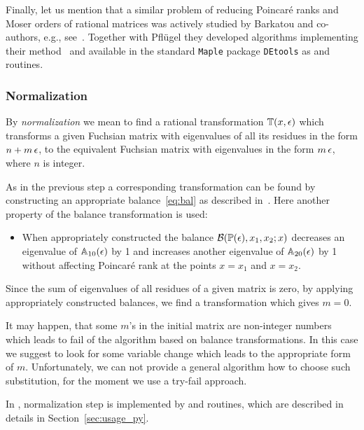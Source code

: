 \documentclass[12pt,a4paper]{article}
\begin{document}
Finally, let us mention that a similar problem of reducing Poincar\'e ranks and Moser orders of rational matrices was actively studied by Barkatou and co-authors, e.g., see~\cite{BP99}.
Together with Pfl\"ugel they developed algorithms implementing their method~\cite{BP99} and available in the standard \texttt{Maple} package \texttt{DEtools} as  and  routines.



\subsubsection{Normalization}
\label{sec:norm}

By {\em normalization} we mean to find a rational transformation $\mathbb{T}(x,\epsilon)$ which transforms a given Fuchsian matrix with eigenvalues of all its residues in the form $n + m \, \epsilon$, to the equivalent Fuchsian matrix with eigenvalues in the form $m \, \epsilon$, where $n$ is integer.

As in the previous step a corresponding transformation can be found by constructing an appropriate balance~\eqref{eq:bal} as described in~\cite[p.~11]{Lee15}.
Here another property of the balance transformation is used:
\begin{itemize}
    \item When appropriately constructed the balance $\mathcal{B}(\mathbb{P}(\epsilon), x_1, x_2; x)$ decreases an eigenvalue of $\mathbb{A}_{10}(\epsilon)$ by 1 and increases another eigenvalue of $\mathbb{A}_{20}(\epsilon)$ by 1 without affecting Poincar\'e rank at the points $x=x_1$ and $x=x_2$.
\end{itemize}
Since the sum of eigenvalues of all residues of a given matrix is zero, by applying appropriately constructed balances, we find a transformation which gives $m = 0$.

It may happen, that some $m$'s in the initial matrix are non-integer numbers which leads to fail of the algorithm based on balance transformations.
In this case we suggest to look for some variable change which leads to the appropriate form of $m$.
Unfortunately, we can not provide a general algorithm how to choose such substitution, for the moment we use a try-fail approach.

In \fuchsia, normalization step is implemented by  and  routines, which are described in details in Section~\ref{sec:usage_py}.
\end{document}
